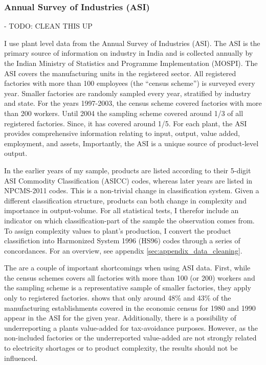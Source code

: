 \documentclass[11pt]{article}
\begin{document}
\subsubsection{Annual Survey of Industries (ASI)}%
\label{sub:annual_survey_of_industries_asi}

- TODO: CLEAN THIS UP 

I use plant level data from the Annual Survey of Industries (ASI). The ASI is the primary source of information on industry in India and is collected annually by the Indian Ministry of Statistics and Programme Implementation (MOSPI). The ASI covers the manufacturing units in the registered sector. All registered factories with more than 100 employees (the ``census scheme'') is surveyed every year. Smaller factories are randomly sampled every year, stratified by industry and state. For the years 1997-2003, the census scheme covered factories with more than 200 workers. Until 2004 the sampling scheme covered around 1/3 of all registered factories. Since, it has covered around 1/5. For each plant, the ASI provides comprehensive information relating to input, output, value added, employment, and assets, Importantly, the ASI is a unique source of product-level output. 

In the earlier years of my sample, products are listed according to their 5-digit ASI Commodity Classification (ASICC) codes, whereas later years are listed in NPCMS-2011 codes. This is a non-trivial change in classification system. Given a different classification structure, products can both change in complexity and importance in output-volume. For all statistical tests, I therefor include an indicator on which classification-part of the sample the observation comes from. To assign complexity values to plant's production, I convert the product classifiction into Harmonized System 1996 (HS96) codes through a series of concordances. For an overview, see appendix \ref{sec:appendix_data_cleaning}.

The are a couple of important shortcomings when using ASI data. First, while the census schemes covers all factories with more than 100 (or 200) workers and the sampling scheme is a representative sample of smaller factories, they apply only to registered factories. \cite{nagaraj_how_2002} shows that only around 48\% and 43\% of the manufacturing establishments covered in the economic census for 1980 and 1990 appear in the ASI for the given year. Additionally, there is a possibility of underreporting a plants value-added for tax-avoidance purposes. However, as the non-included factories or the underreported value-added are not strongly related to electricity shortages or to product complexity, the results should not be influenced. 
\end{document}
